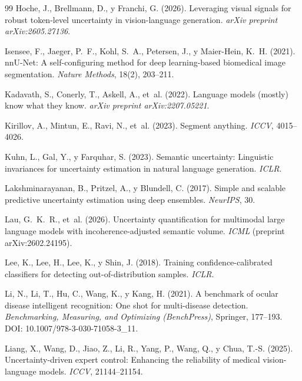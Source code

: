 \documentclass[12pt,a4paper]{article}
\begin{document}
\begin{thebibliography}{99}
Hoche, J., Brellmann, D., y Franchi, G. (2026).
Leveraging visual signals for robust token-level uncertainty in vision-language generation.
\emph{arXiv preprint arXiv:2605.27136}.

Isensee, F., Jaeger, P.~F., Kohl, S.~A., Petersen, J., y Maier-Hein, K.~H. (2021).
nnU-Net: A self-configuring method for deep learning-based biomedical image segmentation.
\emph{Nature Methods}, 18(2), 203--211.

Kadavath, S., Conerly, T., Askell, A., et~al. (2022).
Language models (mostly) know what they know.
\emph{arXiv preprint arXiv:2207.05221}.

Kirillov, A., Mintun, E., Ravi, N., et~al. (2023).
Segment anything.
\emph{ICCV}, 4015--4026.

Kuhn, L., Gal, Y., y Farquhar, S. (2023).
Semantic uncertainty: Linguistic invariances for uncertainty estimation in natural language generation.
\emph{ICLR}.

Lakshminarayanan, B., Pritzel, A., y Blundell, C. (2017).
Simple and scalable predictive uncertainty estimation using deep ensembles.
\emph{NeurIPS}, 30.

Lau, G.~K.~R., et~al. (2026).
Uncertainty quantification for multimodal large language models with incoherence-adjusted semantic volume.
\emph{ICML} (preprint arXiv:2602.24195).

Lee, K., Lee, H., Lee, K., y Shin, J. (2018).
Training confidence-calibrated classifiers for detecting out-of-distribution samples.
\emph{ICLR}.

Li, N., Li, T., Hu, C., Wang, K., y Kang, H. (2021).
A benchmark of ocular disease intelligent recognition: One shot for multi-disease detection.
\emph{Benchmarking, Measuring, and Optimizing (BenchPress)}, Springer, 177--193.
DOI: 10.1007/978-3-030-71058-3\_11.

Liang, X., Wang, D., Jiao, Z., Li, R., Yang, P., Wang, Q., y Chua, T.-S. (2025).
Uncertainty-driven expert control: Enhancing the reliability of medical vision-language models.
\emph{ICCV}, 21144--21154.


\end{thebibliography}
\end{document}
